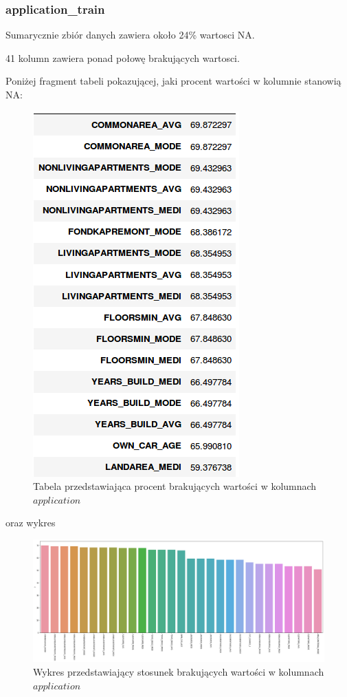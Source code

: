 \documentclass[12pt]{article}
\begin{document}
\subsubsection{application\_train}

Sumarycznie zbiór danych zawiera około 24\% wartosci NA.

41 kolumn zawiera ponad połowę brakujących wartosci.

Poniżej fragment tabeli pokazującej, jaki procent wartości w kolumnie stanowią NA:


\begin{figure}[h!]
\centering
\includegraphics[scale=0.5]{NA.png}
\caption{Tabela przedstawiająca procent brakujących wartości w kolumnach $application$}
\end{figure}

\FloatBarrier

oraz wykres 


\begin{figure}[h!]
\centering
\includegraphics[scale=0.25]{NA2.png}
\caption{Wykres przedstawiający stosunek brakujących wartości w kolumnach $application$}
\end{figure}
\end{document}
